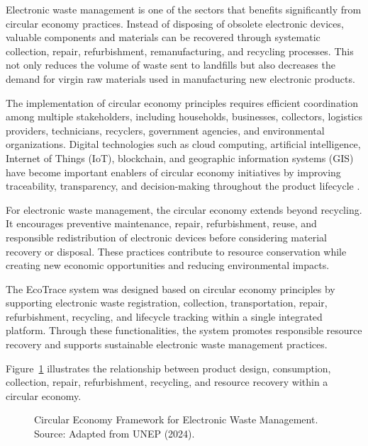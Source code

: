 Electronic waste management is one of the sectors that benefits significantly
from circular economy practices. Instead of disposing of obsolete electronic
devices, valuable components and materials can be recovered through systematic
collection, repair, refurbishment, remanufacturing, and recycling processes. This
not only reduces the volume of waste sent to landfills but also decreases the
demand for virgin raw materials used in manufacturing new electronic products.

The implementation of circular economy principles requires efficient
coordination among multiple stakeholders, including households, businesses,
collectors, logistics providers, technicians, recyclers, government agencies, and
environmental organizations. Digital technologies such as cloud computing,
artificial intelligence, Internet of Things (IoT), blockchain, and geographic
information systems (GIS) have become important enablers of circular economy
initiatives by improving traceability, transparency, and decision-making
throughout the product lifecycle \citep{esmaeilian2020}.

For electronic waste management, the circular economy extends beyond
recycling. It encourages preventive maintenance, repair, refurbishment, reuse, and
responsible redistribution of electronic devices before considering material
recovery or disposal. These practices contribute to resource conservation while
creating new economic opportunities and reducing environmental impacts.

The EcoTrace system was designed based on circular economy principles by
supporting electronic waste registration, collection, transportation, repair,
refurbishment, recycling, and lifecycle tracking within a single integrated platform.
Through these functionalities, the system promotes responsible resource recovery
and supports sustainable electronic waste management practices.

Figure~\ref{fig:circular-framework} illustrates the relationship between product
design, consumption, collection, repair, refurbishment, recycling, and resource
recovery within a circular economy.

\begin{figure}[H]
  \centering
  \caption{Circular Economy Framework for Electronic Waste Management. Source: Adapted from UNEP (2024).}
  \label{fig:circular-framework}
\end{figure}


